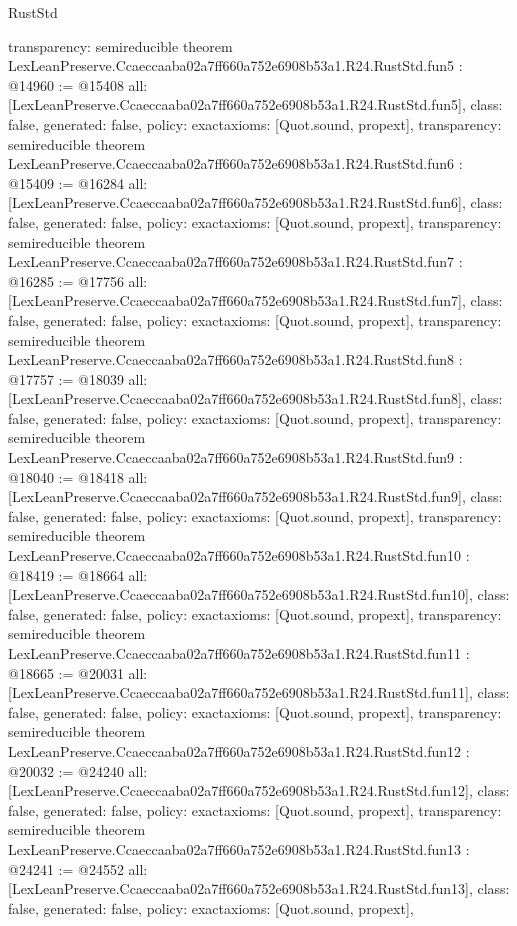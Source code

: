 \begin{lexlean}{RustStd}
\begin{coremodule}
{  transparency: semireducible
}
theorem LexLeanPreserve.Ccaeccaaba02a7ff660a752e6908b53a1.R24.RustStd.fun5 : @14960 := @15408 {
  all: [LexLeanPreserve.Ccaeccaaba02a7ff660a752e6908b53a1.R24.RustStd.fun5],
  class: false,
  generated: false,
  policy: exact{axioms: [Quot.sound, propext]},
  transparency: semireducible
}
theorem LexLeanPreserve.Ccaeccaaba02a7ff660a752e6908b53a1.R24.RustStd.fun6 : @15409 := @16284 {
  all: [LexLeanPreserve.Ccaeccaaba02a7ff660a752e6908b53a1.R24.RustStd.fun6],
  class: false,
  generated: false,
  policy: exact{axioms: [Quot.sound, propext]},
  transparency: semireducible
}
theorem LexLeanPreserve.Ccaeccaaba02a7ff660a752e6908b53a1.R24.RustStd.fun7 : @16285 := @17756 {
  all: [LexLeanPreserve.Ccaeccaaba02a7ff660a752e6908b53a1.R24.RustStd.fun7],
  class: false,
  generated: false,
  policy: exact{axioms: [Quot.sound, propext]},
  transparency: semireducible
}
theorem LexLeanPreserve.Ccaeccaaba02a7ff660a752e6908b53a1.R24.RustStd.fun8 : @17757 := @18039 {
  all: [LexLeanPreserve.Ccaeccaaba02a7ff660a752e6908b53a1.R24.RustStd.fun8],
  class: false,
  generated: false,
  policy: exact{axioms: [Quot.sound, propext]},
  transparency: semireducible
}
theorem LexLeanPreserve.Ccaeccaaba02a7ff660a752e6908b53a1.R24.RustStd.fun9 : @18040 := @18418 {
  all: [LexLeanPreserve.Ccaeccaaba02a7ff660a752e6908b53a1.R24.RustStd.fun9],
  class: false,
  generated: false,
  policy: exact{axioms: [Quot.sound, propext]},
  transparency: semireducible
}
theorem LexLeanPreserve.Ccaeccaaba02a7ff660a752e6908b53a1.R24.RustStd.fun10 : @18419 := @18664 {
  all: [LexLeanPreserve.Ccaeccaaba02a7ff660a752e6908b53a1.R24.RustStd.fun10],
  class: false,
  generated: false,
  policy: exact{axioms: [Quot.sound, propext]},
  transparency: semireducible
}
theorem LexLeanPreserve.Ccaeccaaba02a7ff660a752e6908b53a1.R24.RustStd.fun11 : @18665 := @20031 {
  all: [LexLeanPreserve.Ccaeccaaba02a7ff660a752e6908b53a1.R24.RustStd.fun11],
  class: false,
  generated: false,
  policy: exact{axioms: [Quot.sound, propext]},
  transparency: semireducible
}
theorem LexLeanPreserve.Ccaeccaaba02a7ff660a752e6908b53a1.R24.RustStd.fun12 : @20032 := @24240 {
  all: [LexLeanPreserve.Ccaeccaaba02a7ff660a752e6908b53a1.R24.RustStd.fun12],
  class: false,
  generated: false,
  policy: exact{axioms: [Quot.sound, propext]},
  transparency: semireducible
}
theorem LexLeanPreserve.Ccaeccaaba02a7ff660a752e6908b53a1.R24.RustStd.fun13 : @24241 := @24552 {
  all: [LexLeanPreserve.Ccaeccaaba02a7ff660a752e6908b53a1.R24.RustStd.fun13],
  class: false,
  generated: false,
  policy: exact{axioms: [Quot.sound, propext]},
}
\end{coremodule}
\end{lexlean}
